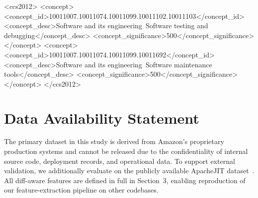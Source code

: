 \documentclass[sigconf,nonacm]{acmart}
\begin{document}
\begin{CCSXML}
<ccs2012>
   <concept>
       <concept_id>10011007.10011074.10011099.10011102.10011103</concept_id>
       <concept_desc>Software and its engineering~Software testing and debugging</concept_desc>
       <concept_significance>500</concept_significance>
   </concept>
   <concept>
       <concept_id>10011007.10011074.10011099.10011692</concept_id>
       <concept_desc>Software and its engineering~Software maintenance tools</concept_desc>
       <concept_significance>500</concept_significance>
   </concept>
</ccs2012>
\end{CCSXML}



\maketitle









\section{Data Availability Statement}
The primary dataset in this study is derived from Amazon's proprietary production systems and cannot be released due to the confidentiality of internal source code, deployment records, and operational data. To support external validation, we additionally evaluate on the publicly available ApacheJIT dataset~\cite{apachejit2022}. All diff-aware features are defined in full in Section~3, enabling reproduction of our feature-extraction pipeline on other codebases.



\end{document}
